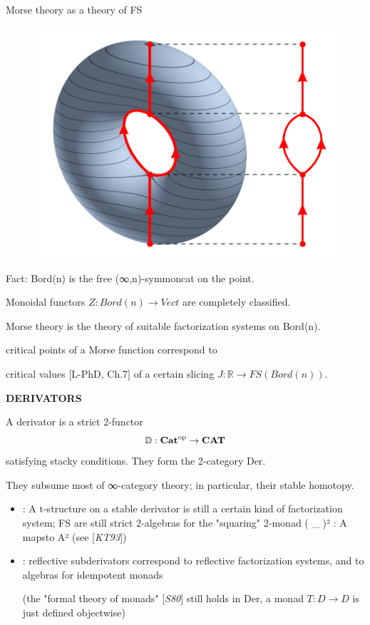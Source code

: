\documentclass{beamer}
\begin{document}
\begin{frame}{Morse theory as a theory of FS}
  \begin{figure}
\includegraphics[scale=.15]{3D-Leveltorus-Reebgraph.png}
  \end{figure}
  
  Fact: Bord(n) is the free (∞,n)-symmoncat on the point.
  
  \vspace{1cm}
  Monoidal functors $Z : Bord(n) \to Vect$ are completely classified.

  \vspace{1cm}
  \onslide<+->
  Morse theory is the theory of suitable factorization systems on Bord(n).

  \alert{critical points of a Morse function}
  correspond to

 \alert{critical values} [\alert{L-PhD}, Ch.7] of a certain slicing $J : \mathbb R \to FS(Bord(n))$.
\end{frame}
%
%
%
%
%
%
%
\begin{frame}
  \Huge\centering \bfseries DERIVATORS
\end{frame}
%
\begin{frame}
  A derivator is a strict 2-functor
  \[\mathbb{D} : {\bf Cat}^\text{op} \to {\bf CAT} \]
  satisfying stacky conditions. They form the 2-category Der.

  They subsume most of ∞-category theory; in particular, their stable homotopy.
  \begin{itemize}
    \item<2-> [{[\alert{LV17}]}] : A t-structure on a stable derivator is still a certain kind of factorization system; FS are still strict 2-algebras for the "squaring" 2-monad ( \_ )² : A mapsto A² (see [\emph{KT93}])
    
    \item<3->  [{[\alert{Lor18}]}] : reflective subderivators correspond to reflective factorization systems, and to algebras for idempotent monads

    (the "formal theory of monads" [\emph{S80}] still holds in Der, a monad $T : D \to D$ is just defined objectwise)
  \end{itemize}
\end{frame}
\end{document}

